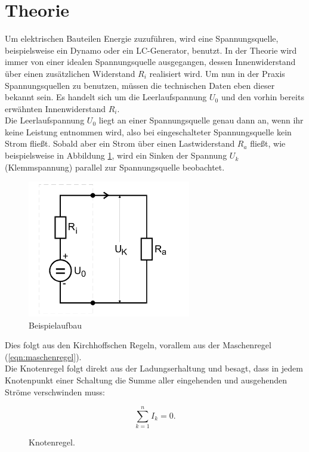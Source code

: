 \section{Theorie}
\label{sec:Theorie}
Um elektrischen Bauteilen Energie zuzuführen, wird eine Spannungsquelle, beispielsweise ein Dynamo oder ein LC-Generator, benutzt.
In der Theorie wird immer von einer idealen Spannungsquelle ausgegangen, dessen Innenwiderstand über einen zusätzlichen Widerstand $R_i$ realisiert wird.
Um nun in der Praxis Spannungsquellen zu benutzen, müssen die technischen Daten eben dieser bekannt sein.
Es handelt sich um die Leerlaufspannung $U_0$ und den vorhin bereits erwähnten Innenwiderstand $R_i$.\\
Die Leerlaufspannung $U_0$ liegt an einer Spannungsquelle genau dann an, wenn ihr keine Leistung entnommen wird, also bei eingeschalteter Spannungsquelle kein Strom fließt.
Sobald aber ein Strom über einen Lastwiderstand $R_a$ fließt, wie beispielsweise in Abbildung \ref{fig:t1}, wird ein Sinken der Spannung $U_k$ (Klemmspannung) parallel zur Spannungsquelle beobachtet.

\begin{figure}[H]
  \centering
  \includegraphics[height=6cm]{innenwiderstand.png}
  \caption{Beispielaufbau \cite{sample}}
  \label{fig:t1}
\end{figure}

Dies folgt aus den Kirchhoffschen Regeln, vorallem aus der Maschenregel (\ref{eqn:maschenregel}).\\
Die Knotenregel folgt direkt aus der Ladungserhaltung und besagt, dass in jedem Knotenpunkt einer Schaltung die Summe aller eingehenden und ausgehenden Ströme verschwinden muss:

\begin{equation}
  \sum_{k=1}^n I_k = 0.
  \label{eqn:knotenregel}
\end{equation}

\begin{figure}[H]
  \centering
  \caption{Knotenregel.}
  \label{fig:knotenregel}
\end{figure}

